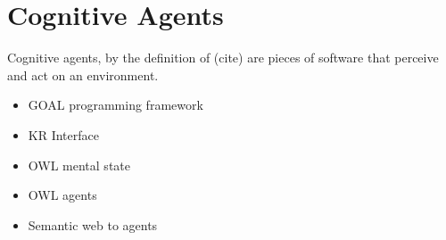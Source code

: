 \chapter{Cognitive Agents}

Cognitive agents, by the definition of (cite) are pieces of software that perceive and act on an environment. 
\begin{itemize}
\item GOAL programming framework
\item KR Interface
\item OWL mental state
\item OWL agents
\item Semantic web to agents
\end{itemize}
  
  
  